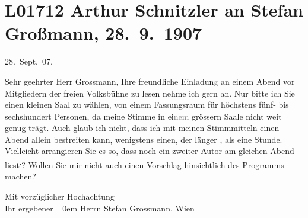 

\section[Arthur Schnitzler an Stefan Großmann, 28. 9. 1907]{L01712 Arthur Schnitzler an Stefan Großmann, 28. 9. 1907}
\nopagebreak{}
\rehead{ }\normalsize\beginnumbering{}
\toendnotes[C]{\smallbreak\pagebreak[2]}
\toendnotes[C]{\smallbreak}
\toendnotes[C]{\smallbreak}
\pstart
           \raggedleft{}{\pb}28. Sept. 07.\pend
           
\pstart{}Sehr geehrter Herr Grossmann,\pend\vspace{0.5em}
\pstart
           Ihre freundliche Einladun\textcolor{gray}{g} an einem Abend vor Mitgliedern der freien Volksbühne zu lesen nehme ich gern an. Nur
               bitte ich Sie einen kleinen Saal zu wählen, von einem Fassungsraum für höchstens
               fünf- bis sechshundert Personen, da meine Stimme in ei\textcolor{gray}{nem} grössern
               Saale nicht weit genug trägt. Auch glaub ich nicht, dass ich mit meinen Stimmmitteln
               einen Abend allein bestreiten kann, wenigstens einen, der länger \label{T_L01712-1v}\label{T_L01712-1}, als eine Stunde.
               Vielleicht arrangieren Sie es so, dass noch ein zweiter Autor am gleichen Abend liest\substVorne{}\textsuperscript{.}\substDazwischen{}?\substHinten{} Wollen Sie mir nicht auch einen Vorschlag hinsichtlich des Programms
               machen?\pend
           
\pstart
           Mit vorzüglicher Hochachtung{\\[\baselineskip]}Ihr ergebener\pend
           \leftskip=0em{}{\vspace{1\baselineskip}}
\pstart
           Herrn Stefan Grossmann, Wien\pend
           \endnumbering{}  \newcommand{\dateiname}{L01712}\newcommand{\titel}{Arthur Schnitzler an Stefan Großmann, 28. 9. 1907}\newcommand{\editorInnen}{Martin Anton Müller und Gerd-Hermann Susen}
